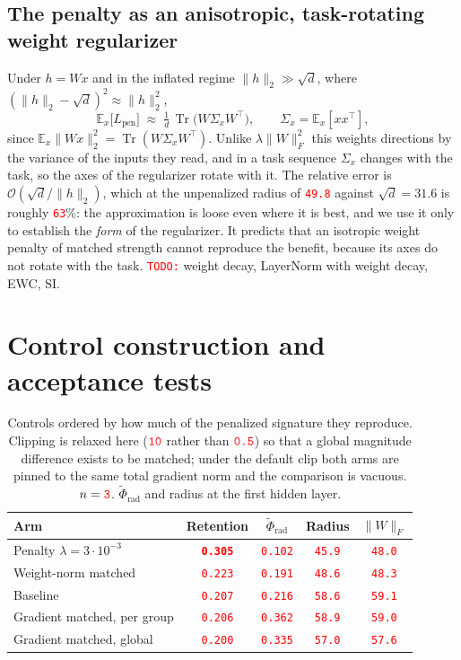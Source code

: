 \documentclass[anon]{opt2026}     %
\newcommand{\PH}[1]{\textcolor{red}{\texttt{#1}}}   %
\newcommand{\phirad}{\tilde{\Phi}_{\mathrm{rad}}}
\DeclareMathOperator{\Tr}{Tr}
\begin{document}
\subsection{The penalty as an anisotropic, task-rotating weight regularizer}
\label{app:aniso}
Under $h = Wx$ and in the inflated regime $\|h\|_2 \gg \sqrt d$, where
$(\|h\|_2-\sqrt d)^2 \approx \|h\|_2^2$,
\begin{equation}
\label{eq:aniso}
\mathbb{E}_x\bigl[L_{\mathrm{pen}}\bigr]
  \;\approx\; \tfrac{1}{d}\,\Tr\!\bigl(W \Sigma_x W^{\top}\bigr),
  \qquad \Sigma_x = \mathbb{E}_x[xx^{\top}] ,
\end{equation}
since $\mathbb{E}_x\|Wx\|_2^2 = \Tr(W\Sigma_x W^\top)$. Unlike
$\lambda\|W\|_F^2$ this weights directions by the variance of the inputs they
read, and in a task sequence $\Sigma_x$ changes with the task, so the axes of
the regularizer rotate with it. The relative error is
$\mathcal{O}(\sqrt d / \|h\|_2)$, which at the unpenalized radius of \PH{49.8}
against $\sqrt d = 31.6$ is roughly \PH{63}\%: the approximation is loose even
where it is best, and we use it only to establish the \emph{form} of the
regularizer. It predicts that an isotropic weight penalty of matched strength
cannot reproduce the benefit, because its axes do not rotate with the task.
\PH{TODO:} weight decay, LayerNorm with weight decay, EWC, SI.

\section{Control construction and acceptance tests}
\label{app:controls}

\begin{table}[!tb]
\centering
\caption{Controls ordered by how much of the penalized signature they reproduce.
Clipping is relaxed here ($\PH{10}$ rather than $\PH{0.5}$) so that a global
magnitude difference exists to be matched; under the default clip both arms are
pinned to the same total gradient norm and the comparison is vacuous.
$n = \PH{3}$. $\phirad$ and radius at the first hidden layer.}
\label{tab:controls}
\small
\begin{tabular}{lcccc}
\toprule
Arm & Retention & $\phirad$ & Radius & $\|W\|_F$ \\
\midrule
Penalty $\lambda = 3\cdot10^{-3}$ & \textbf{\PH{0.305}} & \PH{0.102} & \PH{45.9} & \PH{48.0} \\
Weight-norm matched               & \PH{0.223} & \PH{0.191} & \PH{48.6} & \PH{48.3} \\
Baseline                          & \PH{0.207} & \PH{0.216} & \PH{58.6} & \PH{59.1} \\
Gradient matched, per group       & \PH{0.206} & \PH{0.362} & \PH{58.9} & \PH{59.0} \\
Gradient matched, global          & \PH{0.200} & \PH{0.335} & \PH{57.0} & \PH{57.6} \\
\bottomrule
\end{tabular}
\end{table}
\end{document}
